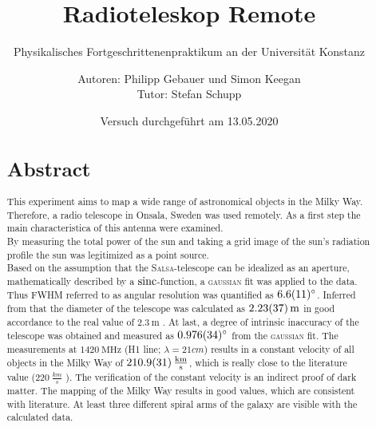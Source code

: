 \title{ Radioteleskop Remote}
\subtitle{Physikalisches Fortgeschrittenenpraktikum an der Universität Konstanz}
\author{Autoren: Philipp Gebauer und Simon Keegan \\ \large{Tutor: Stefan Schupp}}
\date{Versuch durchgeführt am 13.05.2020}
\maketitle
\vspace{2.5 cm}
\begin{abstract}
    \section*{Abstract}
    \begin{singlespace}
    This experiment aims to map a wide range of astronomical objects in the Milky Way. Therefore, a radio telescope in Onsala, Sweden was used remotely.
    As a first step the main characteristica of this antenna were examined.\\
    By measuring the total power of the sun and taking a grid image of the sun's radiation profile the sun was legitimized as a point source. \\
    Based on the assumption that the \textsc{Salsa}-telescope can be idealized as an aperture, mathematically described by a $\operatorname{sinc}$-function, a \textsc{gaussian} fit was applied to the data.
    Thus FWHM referred to as angular resolution was quantified as $\SI{6.6 \pm 1.1}{\degree}$. Inferred from that the diameter of the telescope was calculated as $\SI{2.23 \pm 0.37}{\metre}$ in good accordance to the real value of $\SI{2.3}{\metre}$ \cite{Usermanual}.
    At last, a degree of intrinsic inaccuracy of the telescope was obtained and measured as $\SI{0.976 \pm 0.034}{\degree}$ from the \textsc{gaussian} fit.\newline
    The measurements at $\SI{1420}{\mega \hertz}$ (H1 line; $\lambda = \si{21}{cm}$) results in a constant velocity of all objects in the Milky Way of $\SI{210.9 \pm 3.1}{\frac{km}{s}}$, which is really close to the literature value ($\SI{220}{\frac{km}{s}}$ \cite{LSR}).
    The verification of the constant velocity is an indirect proof of dark matter.\newline
    The mapping of the Milky Way results in good values, which are consistent with literature. 
    At least three different spiral arms of the galaxy are visible with the calculated data.
\end{singlespace}
\end{abstract}

\thispagestyle{empty}
\newpage